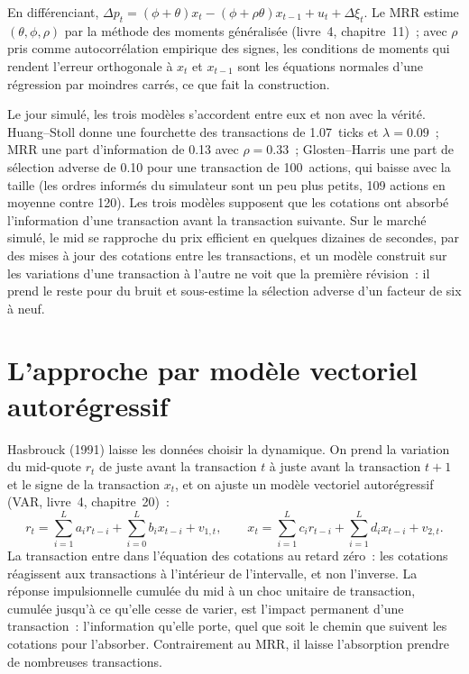 En différenciant, $\Delta p_t=(\phi+\theta)x_t-(\phi+\rho\theta)x_{t-1}+u_t+\Delta\xi_t$. Le MRR estime $(\theta,\phi,\rho)$ par la méthode des
moments généralisée (livre~4, chapitre~11)~; avec $\rho$ pris comme autocorrélation empirique des signes, les conditions de moments qui rendent l'erreur orthogonale
à $x_t$ et $x_{t-1}$ sont les équations normales d'une régression par moindres carrés, ce que fait la construction.

\label{lst:mx:decomposing-the-spread:mrr}

Le jour simulé, les trois modèles s'accordent entre eux et non avec la vérité. Huang--Stoll donne une fourchette des transactions de 1.07~ticks et
$\lambda=0.09$~; MRR une part d'information de 0.13 avec $\rho=0.33$~; Glosten--Harris une part de sélection adverse de 0.10 pour une transaction de 100~actions, qui baisse avec la taille
(les ordres informés du simulateur sont un peu plus petits, 109 actions en moyenne contre 120). Les trois modèles supposent que les cotations ont absorbé
l'information d'une transaction avant la transaction suivante. Sur le marché simulé, le mid se rapproche du prix efficient en quelques dizaines de secondes, par des mises à jour des cotations entre
les transactions, et un modèle construit sur les variations d'une transaction à l'autre ne voit que la première révision~: il prend le reste pour du bruit et sous-estime la sélection adverse
d'un facteur de six à neuf.

\section{L'approche par modèle vectoriel autorégressif}

Hasbrouck (1991) laisse les données choisir la dynamique. On prend la variation du mid-quote $r_t$ de juste avant la transaction $t$ à juste avant la transaction $t+1$ et le signe de la
transaction $x_t$, et on ajuste un modèle vectoriel autorégressif (VAR, livre~4, chapitre~20)~:
\[
r_t=\sum_{i=1}^{L}a_ir_{t-i}+\sum_{i=0}^{L}b_ix_{t-i}+v_{1,t},\qquad x_t=\sum_{i=1}^{L}c_ir_{t-i}+\sum_{i=1}^{L}d_ix_{t-i}+v_{2,t}.
\]
La transaction entre dans l'équation des cotations au retard zéro~: les cotations réagissent aux transactions à l'intérieur de l'intervalle, et non l'inverse. La réponse impulsionnelle cumulée du mid
à un choc unitaire de transaction, cumulée jusqu'à ce qu'elle cesse de varier, est l'impact permanent d'une transaction~: l'information qu'elle porte, quel que soit le chemin que suivent les cotations
pour l'absorber. Contrairement au MRR, il laisse l'absorption prendre de nombreuses transactions.

